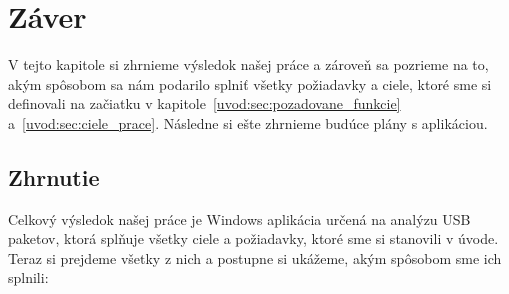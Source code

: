 \chapter{Záver}
V tejto kapitole si zhrnieme výsledok našej práce a zároveň sa pozrieme na to, akým spôsobom sa nám podarilo splniť všetky požiadavky a ciele, ktoré sme si definovali na začiatku v kapitole~\ref{uvod:sec:pozadovane_funkcie} a~\ref{uvod:sec:ciele_prace}. Následne si ešte zhrnieme budúce plány s aplikáciou.



\section{Zhrnutie}
Celkový výsledok našej práce je Windows aplikácia určená na analýzu USB paketov, ktorá splňuje všetky ciele a požiadavky, ktoré sme si stanovili v úvode. Teraz si prejdeme všetky z nich a postupne si ukážeme, akým spôsobom sme ich splnili:
